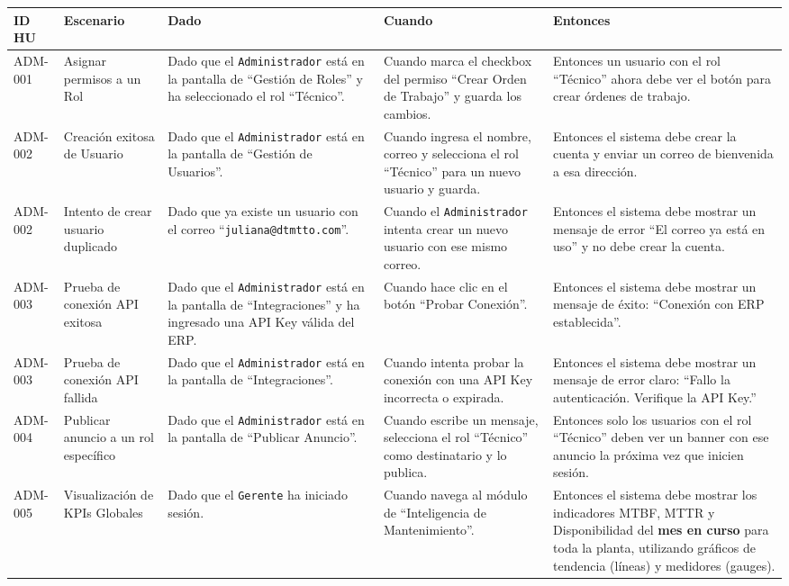 \documentclass[12pt, a4paper]{article}
\begin{document}
\begin{longtable}{|p{1.8cm}|p{3cm}|p{3.5cm}|p{3.5cm}|p{3.5cm}|}
\hline
\textbf{ID HU} & \textbf{Escenario} & \textbf{Dado} & \textbf{Cuando} & \textbf{Entonces} \\ \hline
ADM-001 & Asignar permisos a un Rol & Dado que el \texttt{Administrador} está en la pantalla de ``Gestión de Roles'' y ha seleccionado el rol ``Técnico''. & Cuando marca el checkbox del permiso ``Crear Orden de Trabajo'' y guarda los cambios. & Entonces un usuario con el rol ``Técnico'' ahora debe ver el botón para crear órdenes de trabajo. \\ \hline
ADM-002 & Creación exitosa de Usuario & Dado que el \texttt{Administrador} está en la pantalla de ``Gestión de Usuarios''. & Cuando ingresa el nombre, correo y selecciona el rol ``Técnico'' para un nuevo usuario y guarda. & Entonces el sistema debe crear la cuenta y enviar un correo de bienvenida a esa dirección. \\ \hline
ADM-002 & Intento de crear usuario duplicado & Dado que ya existe un usuario con el correo ``\texttt{juliana@dtmtto.com}''. & Cuando el \texttt{Administrador} intenta crear un nuevo usuario con ese mismo correo. & Entonces el sistema debe mostrar un mensaje de error ``El correo ya está en uso'' y no debe crear la cuenta. \\ \hline
ADM-003 & Prueba de conexión API exitosa & Dado que el \texttt{Administrador} está en la pantalla de ``Integraciones'' y ha ingresado una API Key válida del ERP. & Cuando hace clic en el botón ``Probar Conexión''. & Entonces el sistema debe mostrar un mensaje de éxito: ``Conexión con ERP establecida''. \\ \hline
ADM-003 & Prueba de conexión API fallida & Dado que el \texttt{Administrador} está en la pantalla de ``Integraciones''. & Cuando intenta probar la conexión con una API Key incorrecta o expirada. & Entonces el sistema debe mostrar un mensaje de error claro: ``Fallo la autenticación. Verifique la API Key.'' \\ \hline
ADM-004 & Publicar anuncio a un rol específico & Dado que el \texttt{Administrador} está en la pantalla de ``Publicar Anuncio''. & Cuando escribe un mensaje, selecciona el rol ``Técnico'' como destinatario y lo publica. & Entonces solo los usuarios con el rol ``Técnico'' deben ver un banner con ese anuncio la próxima vez que inicien sesión. \\ \hline
ADM-005 & Visualización de KPIs Globales & Dado que el \texttt{Gerente} ha iniciado sesión. & Cuando navega al módulo de ``Inteligencia de Mantenimiento''. & Entonces el sistema debe mostrar los indicadores MTBF, MTTR y Disponibilidad del \textbf{mes en curso} para toda la planta, utilizando gráficos de tendencia (líneas) y medidores (gauges). \\ \hline

\end{longtable}
\end{document}
